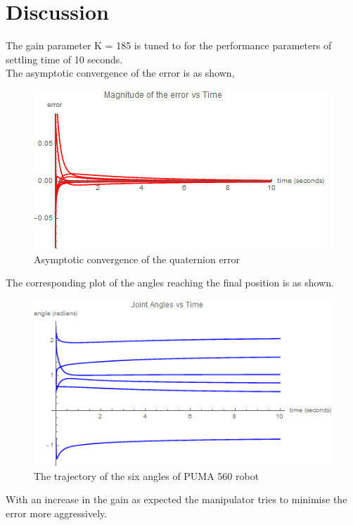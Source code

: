 \documentclass[a4paper,12pt]{article}
\begin{document}
\section{Discussion}
The gain parameter K = 185 is tuned to for the performance parameters of settling time of 10 seconds.\\
The asymptotic convergence of the error is as shown,
\begin{figure}[H]
	\centering
	\includegraphics[scale=0.8]{dqc_error}
	\caption{Asymptotic convergence of the quaternion error}
	\label{fg:dqc_error}
\end{figure}
The corresponding plot of the angles reaching the final position is as shown.
\begin{figure}[h]
	\centering
	\includegraphics[scale=0.8]{dqc_angles}
	\caption{The trajectory of the six angles of PUMA 560 robot}
	\label{fg:dqc_angles}
\end{figure}
With an increase in the gain as expected the manipulator tries to minimise the error more aggressively.
\end{document}
